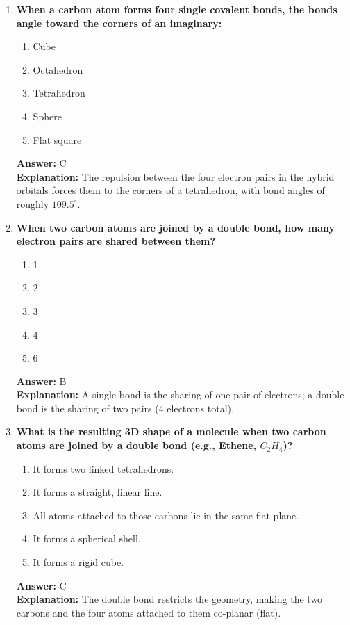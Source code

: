 \documentclass[11pt, a4paper]{article}
\begin{document}
\begin{enumerate}
\item \textbf{When a carbon atom forms four single covalent bonds, the bonds angle toward the corners of an imaginary:}
\begin{enumerate}[label=\Alph*.]
    \item Cube
    \item Octahedron
    \item Tetrahedron
    \item Sphere
    \item Flat square
\end{enumerate}
\textbf{Answer:} C \\
\textbf{Explanation:} The repulsion between the four electron pairs in the hybrid orbitals forces them to the corners of a tetrahedron, with bond angles of roughly $109.5^\circ$.

\item \textbf{When two carbon atoms are joined by a double bond, how many electron pairs are shared between them?}
\begin{enumerate}[label=\Alph*.]
    \item 1
    \item 2
    \item 3
    \item 4
    \item 6
\end{enumerate}
\textbf{Answer:} B \\
\textbf{Explanation:} A single bond is the sharing of one pair of electrons; a double bond is the sharing of two pairs (4 electrons total).

\item \textbf{What is the resulting 3D shape of a molecule when two carbon atoms are joined by a double bond (e.g., Ethene, $C_2H_4$)?}
\begin{enumerate}[label=\Alph*.]
    \item It forms two linked tetrahedrons.
    \item It forms a straight, linear line.
    \item All atoms attached to those carbons lie in the same flat plane.
    \item It forms a spherical shell.
    \item It forms a rigid cube.
\end{enumerate}
\textbf{Answer:} C \\
\textbf{Explanation:} The double bond restricts the geometry, making the two carbons and the four atoms attached to them co-planar (flat).


\end{enumerate}
\end{document}
